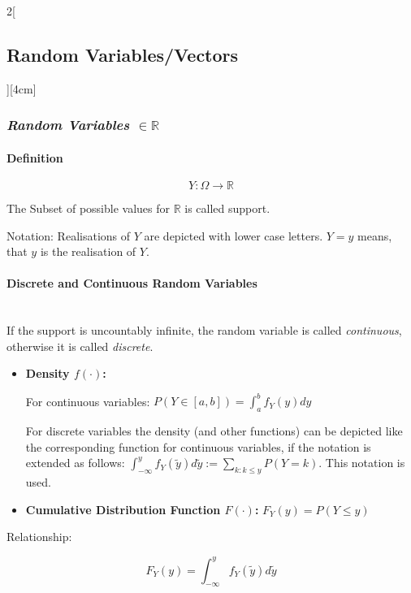 \documentclass[8pt]{extarticle}
\begin{document}
\begin{multicols}{2}[\subsection{Random Variables/Vectors}][4cm]

\subsubsection*{\textit{Random Variables $\in \mathbb{R}$}}

\paragraph{Definition}

$$Y: \Omega \to \mathbb{R}$$

\noindent The Subset of possible values for $\mathbb{R}$ is called support.

\noindent Notation: Realisations of $Y$ are depicted with lower case letters. $Y=y$ means, that $y$ is the realisation of $Y$.

\paragraph{Discrete and Continuous Random Variables} \ \\

\noindent If the support is uncountably infinite, the random variable is called \textit{continuous}, otherwise it is called \textit{discrete}.

\begin{itemize}
\item \textbf{Density \boldmath$f(\cdot)$:} 

For continuous variables:
$P(Y \in \left[a, b\right]) = \int_{a}^{b} f_Y(y) dy$

For discrete variables the density (and other functions) can be depicted like the corresponding function for continuous variables, if the notation is extended as follows: 
$\int_{-\infty}^{y} f_Y(\tilde{y})d\tilde{y} := \sum_{k:k \leq y} P(Y=k)$. This notation is used.

\item \textbf{Cumulative Distribution Function \boldmath$F(\cdot)$:} 
$F_Y(y) =P(Y\leq y)$
\end{itemize}

Relationship:

$$F_Y(y) = \int_{-\infty}^{y} f_Y(\tilde{y})d\tilde{y}$$




\end{multicols}
\end{document}
